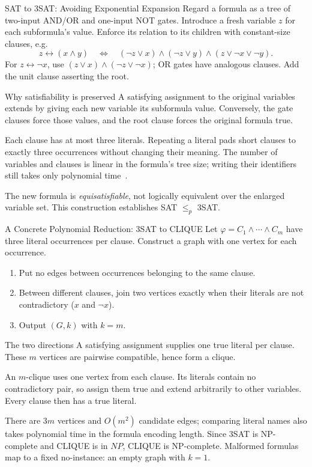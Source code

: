 \documentclass[10pt]{beamer}
\begin{document}
\begin{frame}{SAT to 3SAT: Avoiding Exponential Expansion}
  \small
  Regard a formula as a tree of two-input AND/OR and one-input NOT gates.
  Introduce a fresh variable $z$ for each subformula's value.
  Enforce its relation to its children with constant-size clauses, e.g.
  \[
    z\leftrightarrow(x\land y)
    \quad\Longleftrightarrow\quad
    (\neg z\lor x)\land(\neg z\lor y)\land(z\lor\neg x\lor\neg y).
  \]
  For $z\leftrightarrow\neg x$, use $(z\lor x)\land(\neg z\lor\neg x)$;
  OR gates have analogous clauses. Add the unit clause asserting the root.
  \begin{block}{Why satisfiability is preserved}
    A satisfying assignment to the original variables extends by giving
    each new variable its subformula value. Conversely, the gate clauses
    force those values, and the root clause forces the original formula true.
  \end{block}
  Each clause has at most three literals. Repeating a literal pads short
  clauses to exactly three occurrences without changing their meaning.
  The number of variables and clauses is linear in the formula's tree size;
  writing their identifiers still takes only polynomial time~\cite{cnf-conversion}.
  \par\smallskip
  The new formula is \emph{equisatisfiable}, not logically equivalent over
  the enlarged variable set. This construction establishes SAT $\le_p$ 3SAT.
\end{frame}

\begin{frame}{A Concrete Polynomial Reduction: 3SAT to CLIQUE}
  \small
  Let $\varphi=C_1\land\cdots\land C_m$ have three literal occurrences
  per clause. Construct a graph with one vertex for each occurrence.
  \begin{enumerate}
    \item Put no edges between occurrences belonging to the same clause.
    \item Between different clauses, join two vertices exactly when their
      literals are not contradictory ($x$ and $\neg x$).
    \item Output $(G,k)$ with $k=m$.
  \end{enumerate}
  \begin{block}{The two directions}
    A satisfying assignment supplies one true literal per clause. These
    $m$ vertices are pairwise compatible, hence form a clique.
    \par\smallskip
    An $m$-clique uses one vertex from each clause. Its literals contain
    no contradictory pair, so assign them true and extend arbitrarily to
    other variables. Every clause then has a true literal.
  \end{block}
  There are $3m$ vertices and $O(m^2)$ candidate edges; comparing literal
  names also takes polynomial time in the formula encoding length.
  Since 3SAT is NP-complete and CLIQUE is in $NP$, CLIQUE is NP-complete.
  Malformed formulas map to a fixed no-instance: an empty graph with $k=1$.
\end{frame}
\end{document}
